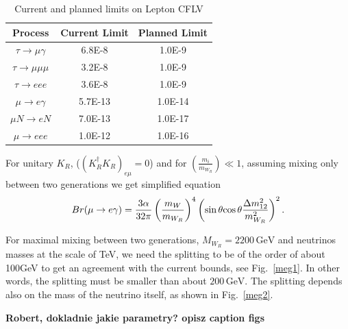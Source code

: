 \documentclass[twocolumn,superscriptaddress,showpacs,prl,nofootinbib,floatfix]{revtex4}
\begin{document}
\begin{table}[h!]
\noindent \begin{centering}
\begin{tabular}{|c|c|c|}
\hline 
Process & Current Limit & Planned Limit\tabularnewline
\hline 
\hline 
$\tau\rightarrow\mu\gamma$ & 6.8E-8 & 1.0E-9\tabularnewline
\hline 
$\tau\rightarrow\mu\mu\mu$ & 3.2E-8 & 1.0E-9\tabularnewline
\hline 
$\tau\rightarrow eee$ & 3.6E-8 & 1.0E-9\tabularnewline
\hline 
$\mu\rightarrow e\gamma$ & 5.7E-13 & 1.0E-14\tabularnewline
\hline 
$\mu N\rightarrow eN$ & 7.0E-13 & 1.0E-17\tabularnewline
\hline 
$\mu\rightarrow eee$ & 1.0E-12 & 1.0E-16\tabularnewline
\hline 
\end{tabular}
\par\end{centering}

\caption{Current and planned limits on Lepton CFLV}
\end{table}

For unitary $K_{R}$, ($\left(K_{R}^{\dagger}K_{R}\right)_{e\mu}=0$)
and for $\left(\frac{m_{i}}{m_{W_{R}}}\right)\ll1$, assuming mixing
only between two generations we get simplified equation
\begin{equation}
Br(\mu\rightarrow e\gamma)=\frac{3\alpha}{32\pi}\left(\frac{m_{W}}{m_{W_{R}}}\right)^{4}\left(\sin\theta\mbox{\ensuremath{\cos\theta}}\frac{\Delta m_{12}^{2}}{m_{W_{R}}^{2}}\right)^{2}.\label{eq:mu2egamma}
\end{equation}

For maximal mixing between two generations, $M_{W_{R}}=2200\,\mathrm{GeV}$
and neutrinos masses at the scale of TeV, we need the splitting to
be of the order of about 100GeV to get an agreement with the current
bounds, see Fig.~\ref{meg1}. In other words, the splitting must be smaller than about $200\,\mathrm{GeV}$.
The splitting depends also on the mass of the neutrino itself, as shown in Fig.~\ref{meg2}.

  {\bf Robert, dokladnie jakie parametry? opisz caption figs}
  
\end{document}
